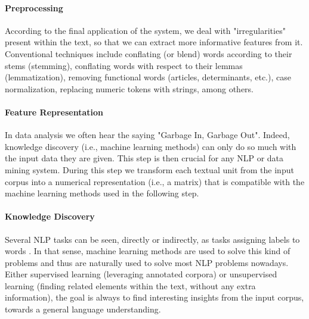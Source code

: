 \paragraph {Preprocessing}  According to the final application of the system, we deal with "irregularities" present within the text, so that we can extract more informative features from it. Conventional techniques include conflating (or blend) words according to their stems (stemming), conflating words with respect to their lemmas (lemmatization), removing functional words (articles, determinants, etc.), case normalization, replacing numeric tokens with strings, among others.

\paragraph {Feature Representation} In data analysis we often hear the saying "Garbage In, Garbage Out". Indeed, knowledge discovery (i.e., machine learning methods)  can only do so much with the input data they are given.  This step is then crucial for any NLP or data mining system.   During this step we transform each textual unit from the input corpus into a numerical representation (i.e., a matrix) that is compatible with the machine learning methods used in the following step.

\paragraph {Knowledge Discovery} Several NLP tasks can be seen, directly or indirectly, as tasks assigning labels to words \cite{Collobert2011}. In that sense, machine learning methods are used to solve this kind of problems and thus are naturally used to solve most NLP problems nowadays. Either supervised learning (leveraging annotated corpora) or unsupervised learning (finding related elements within the text, without any extra information), the goal is always to find interesting insights from the input corpus, towards a general language understanding. 
